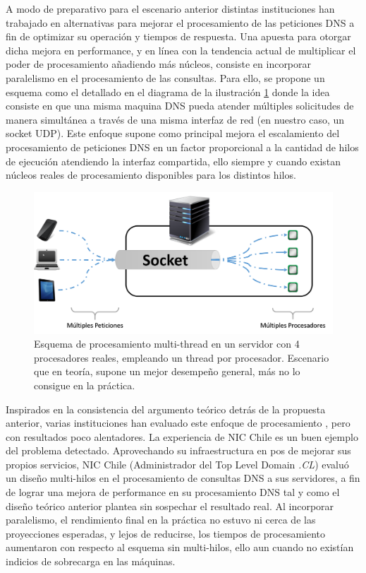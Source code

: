 A modo de preparativo para el escenario anterior distintas instituciones han trabajado en alternativas para mejorar el procesamiento de las peticiones DNS a fin de optimizar su operación y tiempos de respuesta. Una apuesta para otorgar dicha mejora en performance, y en línea con la tendencia actual de multiplicar el poder de procesamiento añadiendo más núcleos, consiste en incorporar paralelismo en el procesamiento de las consultas. Para ello, se propone un esquema como el detallado en el diagrama de la ilustración \ref{fig:multi_thread} donde la idea consiste en que una misma maquina DNS pueda atender múltiples solicitudes de manera simultánea a través de una misma interfaz de red (en nuestro caso, un socket UDP). Este enfoque supone como principal mejora el escalamiento del procesamiento de peticiones DNS en un factor proporcional a la cantidad de hilos de ejecución atendiendo la interfaz compartida, ello siempre y cuando existan núcleos reales de procesamiento disponibles para los distintos hilos. 

\begin{figure}[!h]
	\centering
	\includegraphics[scale=0.45]{imagenes/conf_multi_thread}
	\caption{Esquema de procesamiento multi-thread en un servidor con 4 procesadores reales, empleando un thread por procesador. Escenario que en teoría, supone un mejor desempeño general, más no lo consigue en la práctica.}
	\label{fig:multi_thread}
\end{figure}

Inspirados en la consistencia del argumento teórico detrás de la propuesta anterior, varias instituciones han evaluado este enfoque de procesamiento \cite{url:facebook, paper:toshiba}, pero con resultados poco alentadores. La experiencia de NIC Chile es un buen ejemplo del problema detectado. Aprovechando su infraestructura en pos de mejorar sus propios servicios, NIC Chile (Administrador del Top Level Domain \emph{.CL}) evaluó un diseño multi-hilos en el procesamiento de consultas DNS a sus servidores, a fin de lograr una mejora de performance en su procesamiento DNS tal y como el diseño teórico anterior plantea sin sospechar el resultado real. Al incorporar paralelismo, el rendimiento final en la práctica no estuvo ni cerca de las proyecciones esperadas, y lejos de reducirse, los tiempos de procesamiento aumentaron con respecto al esquema sin multi-hilos, ello aun cuando no existían indicios de sobrecarga en las máquinas.

